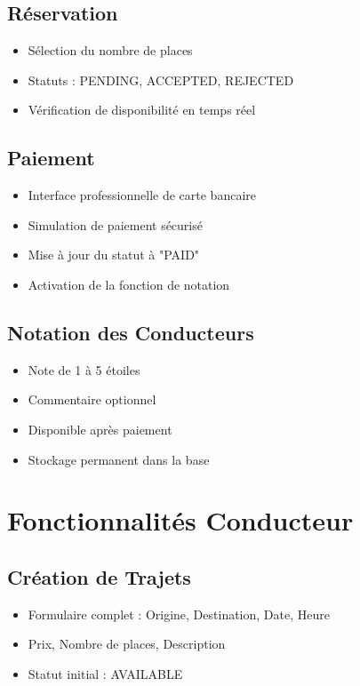 \documentclass[12pt,a4paper]{report}
\begin{document}
\subsection{Réservation}
\begin{itemize}
    \item Sélection du nombre de places
    \item Statuts : PENDING, ACCEPTED, REJECTED
    \item Vérification de disponibilité en temps réel
\end{itemize}

\subsection{Paiement}
\begin{itemize}
    \item Interface professionnelle de carte bancaire
    \item Simulation de paiement sécurisé
    \item Mise à jour du statut à "PAID"
    \item Activation de la fonction de notation
\end{itemize}

\subsection{Notation des Conducteurs}
\begin{itemize}
    \item Note de 1 à 5 étoiles
    \item Commentaire optionnel
    \item Disponible après paiement
    \item Stockage permanent dans la base
\end{itemize}

\section{Fonctionnalités Conducteur}

\subsection{Création de Trajets}
\begin{itemize}
    \item Formulaire complet : Origine, Destination, Date, Heure
    \item Prix, Nombre de places, Description
    \item Statut initial : AVAILABLE
\end{itemize}
\end{document}
